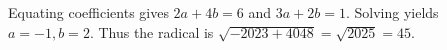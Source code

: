 Equating coefficients gives $2a+4b=6$ and $3a+2b=1$. Solving yields $a=-1,b=2$. Thus the radical is $\sqrt{-2023+4048}=\sqrt{2025}=\boxed{45}$.

